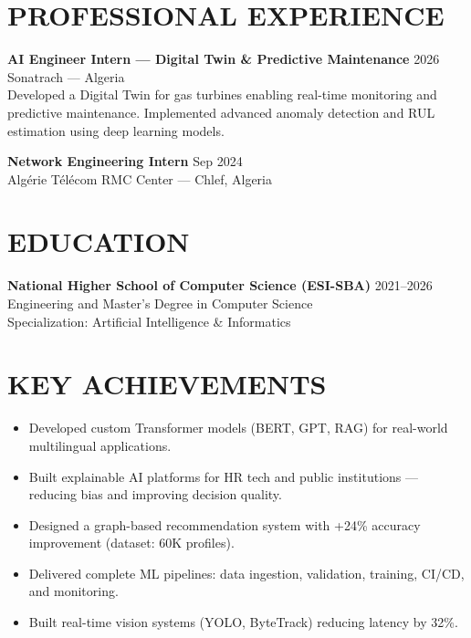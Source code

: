 \documentclass[a4paper,12pt]{article}
\begin{document}
\section{PROFESSIONAL EXPERIENCE}
\textbf{AI Engineer Intern — Digital Twin \& Predictive Maintenance} \hfill 2026 \\
Sonatrach — Algeria \\
Developed a Digital Twin for gas turbines enabling real-time monitoring and predictive maintenance. Implemented advanced anomaly detection and RUL estimation using deep learning models.

\textbf{Network Engineering Intern} \hfill Sep 2024 \\
Algérie Télécom RMC Center — Chlef, Algeria

\section{EDUCATION}
\textbf{National Higher School of Computer Science (ESI-SBA)} \hfill 2021--2026 \\
Engineering and Master’s Degree in Computer Science \\
Specialization: Artificial Intelligence \& Informatics

\section{KEY ACHIEVEMENTS}
\begin{itemize}
    \item Developed custom Transformer models (BERT, GPT, RAG) for real-world multilingual applications.
    \item Built explainable AI platforms for HR tech and public institutions — reducing bias and improving decision quality.
    \item Designed a graph-based recommendation system with +24\% accuracy improvement (dataset: 60K profiles).
    \item Delivered complete ML pipelines: data ingestion, validation, training, CI/CD, and monitoring.
    \item Built real-time vision systems (YOLO, ByteTrack) reducing latency by 32\%.
\end{itemize}

\newpage
\end{document}

